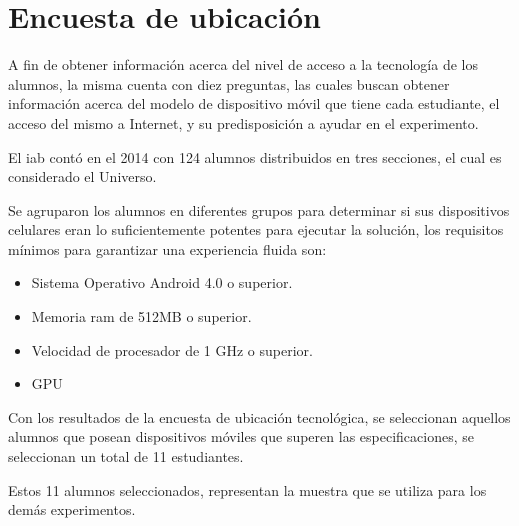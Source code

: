 \section{Encuesta de ubicación}

A fin de obtener información acerca del nivel de acceso a la tecnología de los
alumnos, la misma cuenta con diez preguntas, las cuales buscan obtener
información acerca del modelo de dispositivo móvil que tiene cada estudiante, el
acceso del mismo a Internet, y su predisposición a ayudar en el experimento.

El \Gls{iab} contó en el 2014 con 124 alumnos distribuidos en tres secciones,
el cual es considerado el Universo.

Se agruparon los alumnos en diferentes grupos para determinar si sus dispositivos
celulares eran lo suficientemente potentes para
ejecutar la solución, los requisitos mínimos para garantizar una experiencia
fluida son:

\begin{itemize}
\item Sistema Operativo Android 4.0 o superior.
\item Memoria ram de 512MB o superior.
\item Velocidad de procesador de 1 GHz o superior.
\item GPU 
\end{itemize}

Con los resultados de la encuesta de ubicación tecnológica, se seleccionan
aquellos alumnos que posean dispositivos móviles que superen las especificaciones,
se seleccionan un total de 11 estudiantes.

Estos 11 alumnos seleccionados, representan la muestra que se utiliza para los
demás experimentos.
